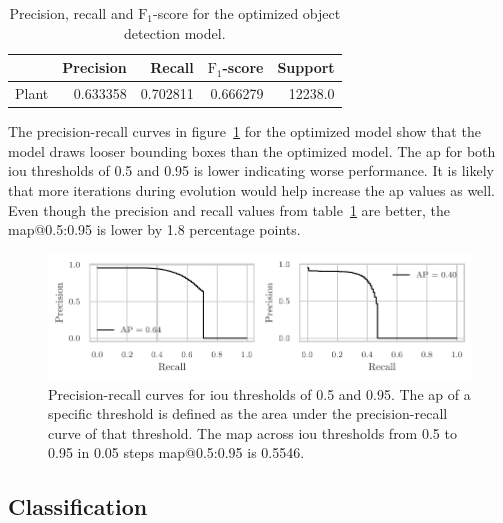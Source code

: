 \documentclass[draft,final]{vutinfth} %
\begin{document}
\begin{table}[h]
  \centering
  \begin{tabular}{lrrrr}
    \toprule
    {} &  Precision &    Recall &  $\mathrm{F}_1$-score &  Support \\
    \midrule
    Plant        &   \num{0.633358} &  \num{0.702811} &  \num{0.666279} &  \num{12238.0} \\
    \bottomrule
  \end{tabular}
  \caption{Precision, recall and $\mathrm{F}_1$-score for the
    optimized object detection model.}
  \label{tab:yolo-metrics-hyp}
\end{table}

The precision-recall curves in figure~\ref{fig:yolo-ap-hyp} for the
optimized model show that the model draws looser bounding boxes than
the optimized model. The \gls{ap} for both \gls{iou} thresholds of
\num{0.5} and \num{0.95} is lower indicating worse performance. It is
likely that more iterations during evolution would help increase the
\gls{ap} values as well. Even though the precision and recall values
from table~\ref{tab:yolo-metrics-hyp} are better, the
\gls{map}@0.5:0.95 is lower by \num{1.8} percentage points.

\begin{figure}
  \centering
  \includegraphics{graphics/APpt5-pt95-final.pdf}
  \caption[Hyper-parameter optimized object detection AP@0.5 and
  AP@0.95.]{Precision-recall curves for \gls{iou} thresholds of
    \num{0.5} and \num{0.95}. The \gls{ap} of a specific threshold is
    defined as the area under the precision-recall curve of that
    threshold. The \gls{map} across \gls{iou} thresholds from
    \num{0.5} to \num{0.95} in \num{0.05} steps \gls{map}@0.5:0.95 is
    \num{0.5546}.}
  \label{fig:yolo-ap-hyp}
\end{figure}

\subsection{Classification}
\label{ssec:classifier-eval}
\end{document}
